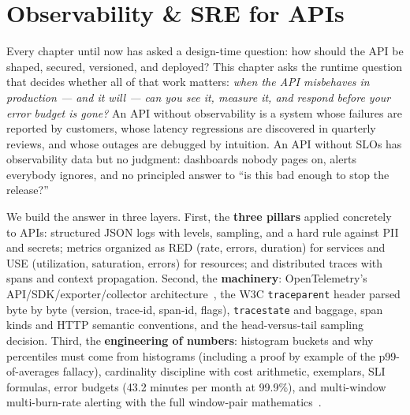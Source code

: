 \chapter{Observability \& SRE for APIs}
\label{ch:observability}

Every chapter until now has asked a design-time question: how should the
API be shaped, secured, versioned, and deployed? This chapter asks the
runtime question that decides whether all of that work matters: \emph{when
the API misbehaves in production --- and it will --- can you see it,
measure it, and respond before your error budget is gone?} An API without
observability is a system whose failures are reported by customers, whose
latency regressions are discovered in quarterly reviews, and whose
outages are debugged by intuition. An API without SLOs has observability
data but no judgment: dashboards nobody pages on, alerts everybody ignores,
and no principled answer to ``is this bad enough to stop the release?''

We build the answer in three layers. First, the \textbf{three pillars}
applied concretely to APIs: structured JSON logs with levels, sampling,
and a hard rule against PII and secrets; metrics organized as RED (rate,
errors, duration) for services and USE (utilization, saturation, errors)
for resources; and distributed traces with spans and context propagation.
Second, the \textbf{machinery}: OpenTelemetry's API/SDK/exporter/collector
architecture~\cite{opentelemetrydocs}, the W3C \texttt{traceparent} header
parsed byte by byte (version, trace-id, span-id, flags), \texttt{tracestate}
and baggage, span kinds and HTTP semantic conventions, and the head-versus-tail
sampling decision. Third, the \textbf{engineering of numbers}: histogram
buckets and why percentiles must come from histograms (including a proof
by example of the p99-of-averages fallacy), cardinality discipline with
cost arithmetic, exemplars, SLI formulas, error budgets (43.2 minutes per
month at 99.9\%), and multi-window multi-burn-rate alerting with the full
window-pair mathematics~\cite{beyer2016sre}.

